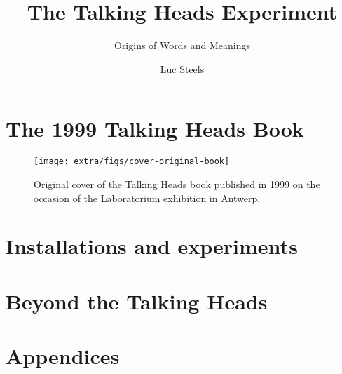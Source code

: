 \documentclass[ number=1
			   ,series=cmle
			   ,url=http://langsci-press.org/ 
			   ,isbn=978-3-944675-42-8
			   ,output=short   %
			   ,smallfont
			   ,biblatex
			   ,draftmode  
			   ,draft
			  ]{LSP/langsci}
\title{The Talking Heads Experiment}
\subtitle{Origins of Words and Meanings}
\author{Luc Steels}
\begin{document}
 


\maketitle                
\frontmatter

\tableofcontents    

\mainmatter 

\part{The 1999 Talking Heads Book}

\begin{figure}[htbp]
  \centerline{\texttt{[image: extra/figs/cover-original-book]}}
\caption{\small\label{left-right} Original cover of the Talking Heads book published in 1999 on the occasion of the 
Laboratorium exhibition in Antwerp.}
\label{f:cover}
\end{figure}








\part{Installations and experiments}



\part{Beyond the Talking Heads}





\part{Appendices} 



% 

\backmatter
{}%
\printbibliography %
\clearpage
   

\printindex 
  
\printindex[lan] 
  
\printindex[sbj]
                              
\end{document}
